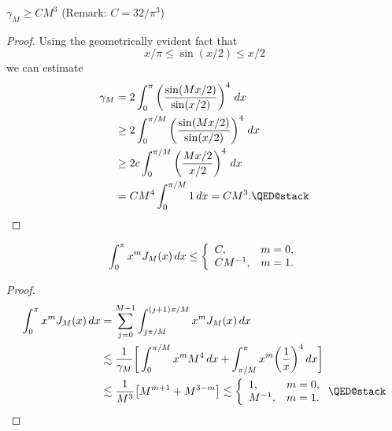 \begin{lemma}
  $\gamma_M \geq C M^3$ (Remark: $C = 32/\pi^3$)
\end{lemma}
\begin{proof}
  Using the geometrically evident fact that
  \[
    x/\pi \leq \sin(x/2) \leq x/2
  \]
  we can estimate
  \begin{align*}
    \gamma_M
    &= 2 \int_0^\pi  \left( \frac{\sin( Mx/2)}{\sin(x/2)} \right)^4 \, dx  \\
    &\geq 2 \int_0^{\pi/M} \left( \frac{\sin( Mx/2)}{\sin(x/2)} \right)^4 \, dx \\
    &\geq 2c \int_0^{\pi/M} \left( \frac{Mx/2}{x/2} \right)^4 \, dx \\
    &= C M^4 \int_0^{\pi/M} 1 \,dx = C M^3. \qedhere
  \end{align*}
\end{proof}

\begin{lemma} \label{th:trig:jackson_moments}
  \[
    \int_0^\pi x^m J_M(x) \,dx \leq
      \left\{ \begin{array}{ll} C, & m = 0, \\
            C M^{-1}, & m = 1.
           \end{array} \right.
  \]
\end{lemma}
\begin{proof}
  \begin{align*}
    \int_0^\pi x^m J_M(x) \, dx
    &= \sum_{j = 0}^{M-1} \int_{j\pi/M}^{(j+1)\pi/M} x^m J_M(x) \, dx \\
    &\lesssim
        \frac{1}{\gamma_M} \bg[ \int_0^{\pi/M} x^m M^4 \, dx
        + \int_{\pi/M}^{\pi}
             x^m \bg( \frac{1}{x} \bg)^4 \, dx \bg] \\
    &\lesssim
      \frac{1}{M^3} \b[ M^{m+1} + M^{3-m} \b]
    \lesssim
      \cases{
        1, & m = 0, \\
        M^{-1}, & m = 1.
      }
      \qedhere
  \end{align*}
\end{proof}


